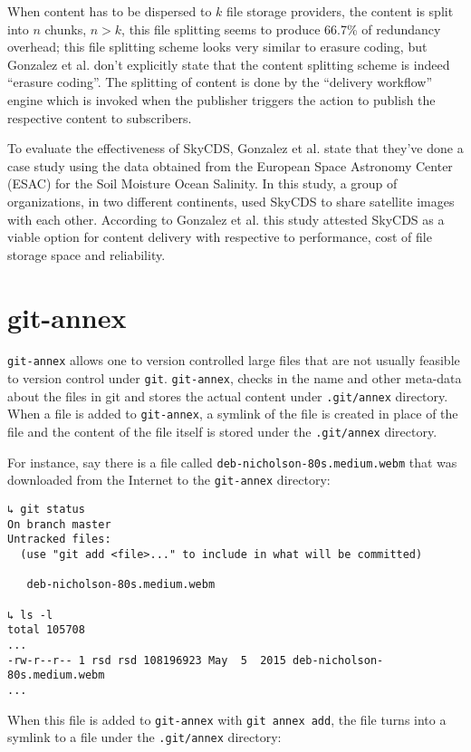 When content has to be dispersed to $k$ file storage providers, the
content is split into $n$ chunks, $n > k$, this file splitting seems
to produce 66.7\% of redundancy overhead\cite{skycds}; this file
splitting scheme looks very similar to erasure coding, but Gonzalez et
al. don't explicitly state that the content splitting scheme is indeed
``erasure coding''. The splitting of content is done by the ``delivery
workflow'' engine which is invoked when the publisher triggers the
action to publish the respective content to subscribers.

To evaluate the effectiveness of SkyCDS, Gonzalez et al. state that
they've done a case study using the data obtained from the European
Space Astronomy Center (ESAC) for the Soil Moisture Ocean Salinity. In
this study, a group of organizations, in two different continents,
used SkyCDS to share satellite images with each other. According to
Gonzalez et al. this study attested SkyCDS as a viable option for
content delivery with respective to performance, cost of file storage
space and reliability.

\section{git-annex}\label{2-gitannex-sec}

\verb+git-annex+ allows one to version controlled large files that are
not usually feasible to version control under
\verb+git+\cite{program:git}. \verb+git-annex+, checks in the name
and other meta-data about the files in git and stores the actual
content under \verb+.git/annex+ directory. When a file is added to
\verb+git-annex+, a symlink of the file is created in place of the
file and the content of the file itself is stored under the
\verb+.git/annex+ directory.

For instance, say there is a file called
\verb+deb-nicholson-80s.medium.webm+ that was downloaded from the
Internet to the \verb+git-annex+ directory:

\begin{verbatim}
↳ git status
On branch master
Untracked files:
  (use "git add <file>..." to include in what will be committed)

   deb-nicholson-80s.medium.webm

↳ ls -l
total 105708
...
-rw-r--r-- 1 rsd rsd 108196923 May  5  2015 deb-nicholson-80s.medium.webm
...
\end{verbatim}

When this file is added to \verb+git-annex+ with \verb+git annex add+,
the file turns into a symlink to a file under the \verb+.git/annex+
directory:

